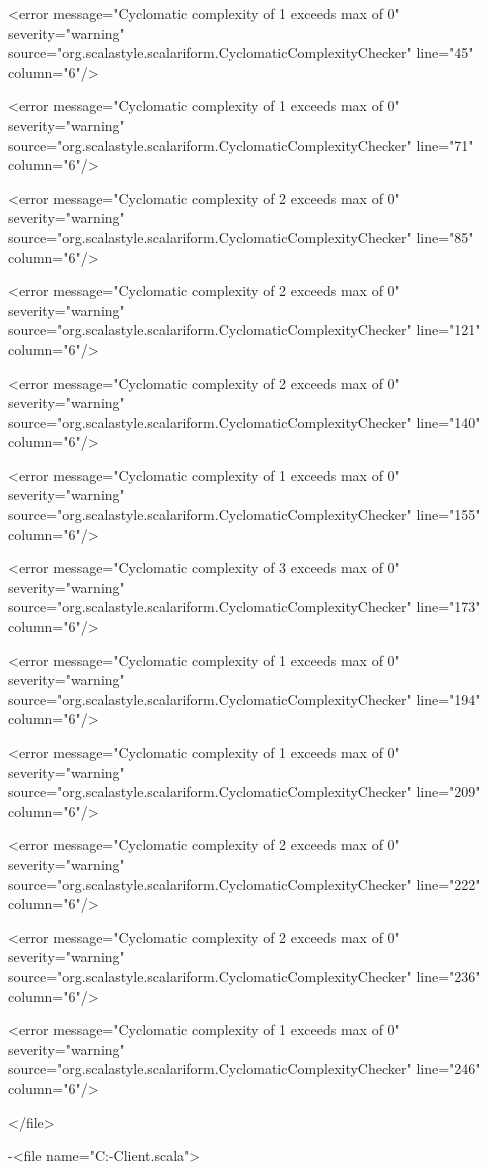 \documentclass{scalatekids-article}
\begin{document}
<error message="Cyclomatic complexity of 1 exceeds max of 0" severity="warning" source="org.scalastyle.scalariform.CyclomaticComplexityChecker" line="45" column="6"/>

<error message="Cyclomatic complexity of 1 exceeds max of 0" severity="warning" source="org.scalastyle.scalariform.CyclomaticComplexityChecker" line="71" column="6"/>

<error message="Cyclomatic complexity of 2 exceeds max of 0" severity="warning" source="org.scalastyle.scalariform.CyclomaticComplexityChecker" line="85" column="6"/>

<error message="Cyclomatic complexity of 2 exceeds max of 0" severity="warning" source="org.scalastyle.scalariform.CyclomaticComplexityChecker" line="121" column="6"/>

<error message="Cyclomatic complexity of 2 exceeds max of 0" severity="warning" source="org.scalastyle.scalariform.CyclomaticComplexityChecker" line="140" column="6"/>

<error message="Cyclomatic complexity of 1 exceeds max of 0" severity="warning" source="org.scalastyle.scalariform.CyclomaticComplexityChecker" line="155" column="6"/>

<error message="Cyclomatic complexity of 3 exceeds max of 0" severity="warning" source="org.scalastyle.scalariform.CyclomaticComplexityChecker" line="173" column="6"/>

<error message="Cyclomatic complexity of 1 exceeds max of 0" severity="warning" source="org.scalastyle.scalariform.CyclomaticComplexityChecker" line="194" column="6"/>

<error message="Cyclomatic complexity of 1 exceeds max of 0" severity="warning" source="org.scalastyle.scalariform.CyclomaticComplexityChecker" line="209" column="6"/>

<error message="Cyclomatic complexity of 2 exceeds max of 0" severity="warning" source="org.scalastyle.scalariform.CyclomaticComplexityChecker" line="222" column="6"/>

<error message="Cyclomatic complexity of 2 exceeds max of 0" severity="warning" source="org.scalastyle.scalariform.CyclomaticComplexityChecker" line="236" column="6"/>

<error message="Cyclomatic complexity of 1 exceeds max of 0" severity="warning" source="org.scalastyle.scalariform.CyclomaticComplexityChecker" line="246" column="6"/>

</file>


-<file name="C:\Users\Davide\Documents\GitHub\Actorbase-Client\src\main\scala\com\actorbase\driver\data\ActorbaseCollectionMap.scala">
\end{document}
